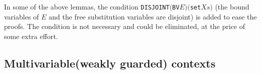 \documentclass[GCNS]{yincog}
\renewcommand{\HOLinline}[1]{\mbox{\textup{\texttt{#1}}}}
\renewcommand{\HOLConst}[1]{\texttt{#1}}
\renewcommand{\HOLFreeVar}[1]{\ensuremath{\mathit{#1}}}
\theoremstyle{remark}
\theoremstyle{theorem}
\theoremstyle{remark}
\newcommand{\Multivariate}{Multivariable\xspace}
\begin{document}
In some of the above lemmas, the condition
\HOLinline{\HOLConst{DISJOINT}\\\;\ensuremath{(}\HOLConst{BV}\\\;\HOLFreeVar{E}\ensuremath{)}\\\;\ensuremath{(}\HOLConst{set}\\\;\HOLFreeVar{Xs}\ensuremath{)}}
(the bound variables of $E$ and the free substitution variables are disjoint)
is added to ease the proofs. The condition is not necessary and could be
eliminated, at the price of some extra effort.

\subsection{\Multivariate (weakly guarded) contexts}
 \label{sec5.3}
\end{document}
